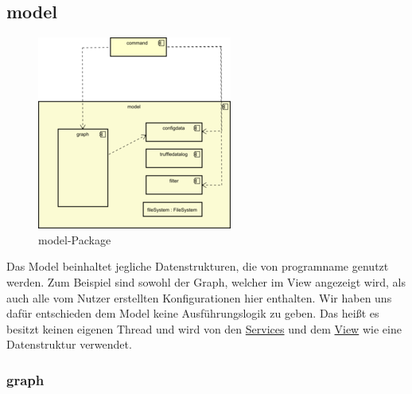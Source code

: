 \subsection{model}
\label{subsec:model}

\begin{figure}[H]
  \centering
  \includegraphics[width=\textwidth]{../diagramimages/model.png}
  \caption{model-Package}
\end{figure}

\medskip
Das Model beinhaltet jegliche Datenstrukturen, die von \gls{programname} genutzt
werden. Zum Beispiel sind sowohl der Graph, welcher im View angezeigt wird,
als auch alle vom Nutzer erstellten Konfigurationen hier enthalten. Wir haben uns
dafür entschieden dem Model keine Ausführungslogik zu geben.
Das heißt es besitzt keinen eigenen Thread und wird von den
\hyperref[subsec:service]{Services} und dem \hyperref[subsec:view]{View} wie eine Datenstruktur verwendet.

    \subsubsection{graph}
    \label{subsubsec:graph}

